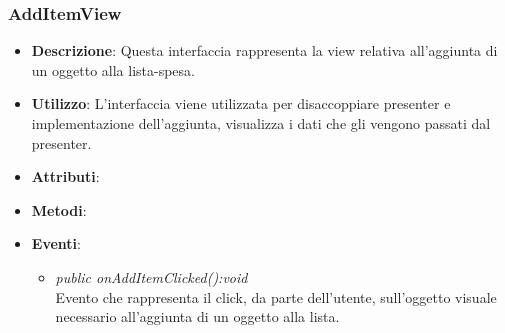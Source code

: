 \subsubsection{AddItemView}
\begin{itemize}
\item \textbf{Descrizione}: Questa interfaccia rappresenta la view relativa all'aggiunta di un oggetto alla lista-spesa.
\item \textbf{Utilizzo}: L'interfaccia viene utilizzata per disaccoppiare presenter e implementazione dell'aggiunta, visualizza i dati che gli vengono passati dal presenter.
\item \textbf{Attributi}: 
\item \textbf{Metodi}:
\item \textbf{Eventi}:
	\begin{itemize}	
	\item \textit{public onAddItemClicked():void}\\
	Evento che rappresenta il click, da parte dell'utente, sull'oggetto visuale necessario all'aggiunta di un oggetto alla lista.
	\end{itemize}
\end{itemize}

